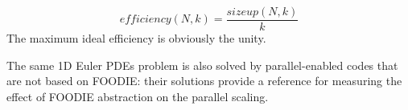 \begin{equation}
  efficiency(N, k) = \frac{sizeup(N, k)}{k}
  \label{eq:weak-scaling-efficiency}
\end{equation}
The maximum ideal efficiency is obviously the unity.

The same 1D Euler PDEs problem is also solved by parallel-enabled codes that are not based on FOODIE: their solutions provide a reference for measuring the effect of FOODIE abstraction on the parallel scaling.




